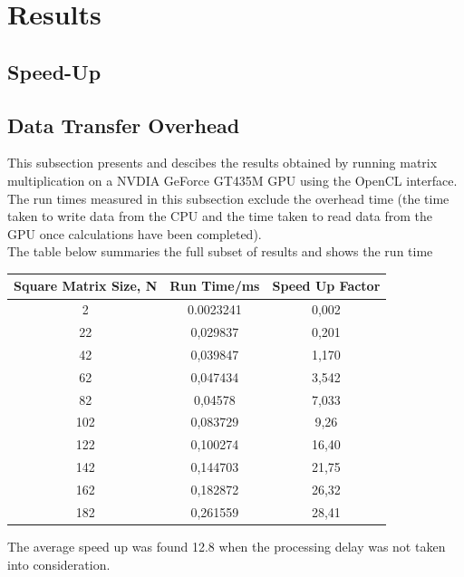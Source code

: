 \section{Results}


\subsection{Speed-Up}

\subsection{Data Transfer Overhead}
This subsection presents and descibes the results obtained by running matrix multiplication on a NVDIA GeForce GT435M GPU using the OpenCL interface. The run times measured in this subsection exclude the overhead time (the time taken to write data from the CPU and the time taken to read data from the GPU once calculations have been completed). 
\\
The table below summaries the full subset of results and shows the run time 
\begin{center}
	\begin{tabular}{||c c c||} 
		\hline
		Square Matrix Size, N &  Run Time/ms & Speed Up Factor \\ [0.1ex] 
		\hline\hline
		2 &	0.0023241 & 0,002\\
		\hline
		22 & 0,029837 & 0,201\\
		\hline
		42 & 0,039847 & 1,170\\
		\hline
		62 & 0,047434 & 3,542\\
		\hline
		82 & 0,04578 & 7,033\\
		\hline
		102	& 0,083729 & 9,26\\
		\hline
	    122	& 0,100274 & 16,40\\
		\hline
		142	& 0,144703 & 21,75\\
		\hline
		162	& 0,182872 & 26,32\\
		\hline
		182	& 0,261559 & 28,41\\
		\hline
		
	\end{tabular}
\end{center}

The average speed up was found 12.8 when the processing delay was not taken into consideration.
\\

